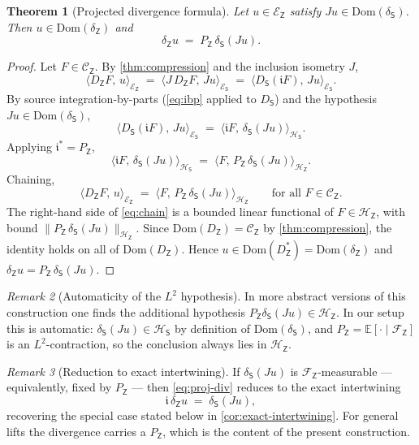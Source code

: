 \documentclass[11pt,reqno]{amsart}
\theoremstyle{plain}
\newtheorem{theorem}{Theorem}[section]
\theoremstyle{definition}
\theoremstyle{remark}
\newtheorem{remark}[theorem]{Remark}
\newcommand{\E}{\mathbb{E}}
\newcommand{\Hilb}{\mathcal{H}}
\newcommand{\Dom}{\mathrm{Dom}}
\newcommand{\Energy}{\mathcal{E}}
\newcommand{\Source}{\mathsf{S}}
\newcommand{\Obs}{\mathsf{Z}}
\renewcommand{\iota}{\mathfrak{i}}
\begin{document}
\begin{theorem}[Projected divergence formula]\label{thm:proj-div}
Let $u\in\Energy_\Obs$ satisfy $Ju\in\Dom(\delta_\Source)$. Then
$u\in\Dom(\delta_\Obs)$ and
\begin{equation}\label{eq:proj-div}
  \delta_\Obs u \;=\; P_\Obs\,\delta_\Source(Ju).
\end{equation}
\end{theorem}

\begin{proof}
Let $F\in\mathcal C_\Obs$. By \cref{thm:compression} and the inclusion
isometry $J$,
\[
  \langle D_\Obs F,\,u\rangle_{\Energy_\Obs}
  \;=\;\langle J\,D_\Obs F,\,Ju\rangle_{\Energy_\Source}
  \;=\;\langle D_\Source(\iota F),\,Ju\rangle_{\Energy_\Source}.
\]
By source integration-by-parts (\cref{eq:ibp} applied to $D_\Source$)
and the hypothesis $Ju\in\Dom(\delta_\Source)$,
\[
  \langle D_\Source(\iota F),\,Ju\rangle_{\Energy_\Source}
  \;=\;\langle\iota F,\,\delta_\Source(Ju)\rangle_{\Hilb_\Source}.
\]
Applying $\iota^{*}=P_\Obs$,
\[
  \langle\iota F,\,\delta_\Source(Ju)\rangle_{\Hilb_\Source}
  \;=\;\langle F,\,P_\Obs\,\delta_\Source(Ju)\rangle_{\Hilb_\Obs}.
\]
Chaining,
\begin{equation}\label{eq:chain}
  \langle D_\Obs F,\,u\rangle_{\Energy_\Obs}
  \;=\;\langle F,\,P_\Obs\,\delta_\Source(Ju)\rangle_{\Hilb_\Obs}
  \qquad\text{for all }F\in\mathcal C_\Obs.
\end{equation}
The right-hand side of \cref{eq:chain} is a bounded linear functional of
$F\in\Hilb_\Obs$, with bound
$\|P_\Obs\,\delta_\Source(Ju)\|_{\Hilb_\Obs}$. Since
$\Dom(D_\Obs)=\mathcal C_\Obs$ by \cref{thm:compression}, the identity
holds on all of $\Dom(D_\Obs)$. Hence $u\in\Dom(D_\Obs^{*})=
\Dom(\delta_\Obs)$ and $\delta_\Obs u=P_\Obs\,\delta_\Source(Ju)$.
\end{proof}

\begin{remark}[Automaticity of the $L^{2}$ hypothesis]
\label{rem:l2-auto}
In more abstract versions of this construction one finds the additional
hypothesis $P_\Obs\delta_\Source(Ju)\in\Hilb_\Obs$. In our setup this is
automatic: $\delta_\Source(Ju)\in\Hilb_\Source$ by definition of
$\Dom(\delta_\Source)$, and $P_\Obs=\E[\cdot\mid\mathcal F_\Obs]$ is an
$L^{2}$-contraction, so the conclusion always lies in $\Hilb_\Obs$.
\end{remark}

\begin{remark}[Reduction to exact intertwining]\label{rem:exact-special}
If $\delta_\Source(Ju)$ is $\mathcal F_\Obs$-measurable --- equivalently,
fixed by $P_\Obs$ --- then \cref{eq:proj-div} reduces to the exact
intertwining
\[
  \iota\,\delta_\Obs u \;=\; \delta_\Source(Ju),
\]
recovering the special case stated below in
\cref{cor:exact-intertwining}. For general lifts the divergence carries
a $P_\Obs$, which is the content of the present construction.
\end{remark}
\end{document}
